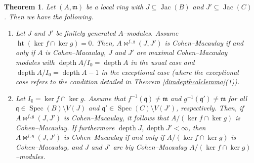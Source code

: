\documentclass[10pt,a4paper]{amsart}
\newtheorem{theorem}{Theorem}
\DeclareMathOperator{\depth}{depth}
\DeclareMathOperator{\height}{ht}
\DeclareMathOperator{\jac}{Jac}
\DeclareMathOperator{\spec}{Spec}
\begin{document}
\begin{theorem}\label{cohenmacthm}
    Let $(A,\mathfrak{m})$ be a local ring with $J\subseteq \jac(B)$ and $J'\subseteq \jac(C)$. Then we have the following.
    \begin{enumerate}
        \item Let $J$ and $J'$ be finitely generated $A$--modules. Assume $\height(\ker f\cap \ker g)=0$. Then, $A\bowtie^{f,g}(J,J')$ is Cohen--Macaulay if and only if $A$ is Cohen--Macaulay, $J$ and $J'$ are maximal Cohen--Macaulay modules with $\depth A/I_0=\depth A$ in the usual case and $\depth A/I_0=\depth A-1$ in the exceptional case (where the exceptional case refers to the condition detailed in Theorem \ref{dimdepthcalclemma}(1)).

        \item  Let $I_0= \ker f\cap\ker g$. Assume that $f^{-1}(\mathfrak{q}) \neq \mathfrak{m}$ and $g^{-1}(\mathfrak{q}') \neq \mathfrak{m}$ for all $\mathfrak{q}\in \spec (B)\setminus V(J)$ and $\mathfrak{q}'\in\spec (C)\setminus V(J')$, respectively. Then, if $A\bowtie^{f,g}(J,J')$ is Cohen--Macaulay, it follows that $A/(\ker f\cap \ker g)$ is Cohen--Macaulay. If furthermore $\depth J,\depth J'<\infty$, then $A\bowtie^{f,g}(J,J')$ is Cohen--Macaulay if and only if $A/(\ker f\cap \ker g)$ is Cohen--Macaulay, and $J$ and $J'$ are big Cohen--Macaulay $A/(\ker f\cap \ker g)$--modules. 
    \end{enumerate}
\end{theorem}
\end{document}
